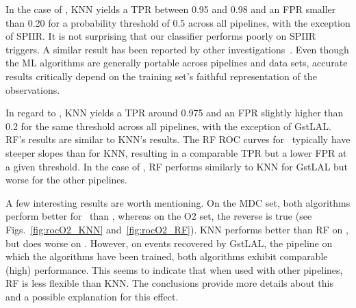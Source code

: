 In the case of \hasns, \ac{KNN} yields a \ac{TPR} between 0.95 and 0.98 and an \ac{FPR} smaller than 0.20 for a probability threshold of 0.5 across all pipelines, with the exception of
SPIIR. It is not surprising that our classifier performs poorly on SPIIR triggers. A similar result has been reported by other investigations~\cite{Chaudhary:2023vec}.  Even though the \ac{ML}
algorithms are generally portable across pipelines and data sets, accurate results critically depend on the training set's faithful representation of the observations.  

In regard to
\hasrem, \ac{KNN} yields a \ac{TPR} around 0.975 and an \ac{FPR} slightly higher than 0.2 for the same threshold across all pipelines, with the exception of GstLAL. \ac{RF}'s results are
similar to \ac{KNN}'s results. The \ac{RF} \ac{ROC} curves for \hasns\ typically have steeper slopes than for \ac{KNN}, resulting in a comparable \ac{TPR} but a lower \ac{FPR} at a given
threshold. In the case of \hasrem, \ac{RF} performs similarly to \ac{KNN} for GstLAL but worse for the other pipelines.

A few interesting results are worth mentioning.  On the \ac{MDC} set, both algorithms perform better for \hasns\ than \hasrem, whereas on the \ac{O2} set, the reverse is true (see
Figs.~\ref{fig:rocO2_KNN} and~\ref{fig:rocO2_RF}). \ac{KNN} performs better than \ac{RF} on \hasrem, but does worse on \hasns. However, on events recovered by GstLAL, the pipeline on
which the algorithms have been trained, both algorithms exhibit comparable (high) performance. This seems to indicate that when used with other pipelines, \ac{RF} is less flexible than
\ac{KNN}. The conclusions provide more details about this and a possible explanation for this effect.

